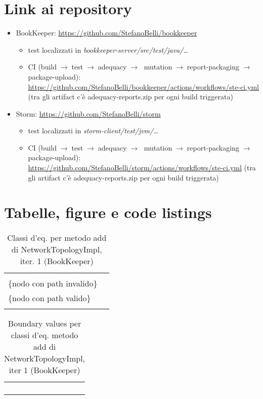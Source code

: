\documentclass[10pt, a4paper]{article}
\newcommand{\Intmaketable}[4]{
	\begin{longtable}{#3}
	#4
	\caption{#2}
	\label{#1}
	\end{longtable}
}
\newcommand{\Intceqtable}[3]{
	\Intmaketable{#1}{#2}{|l|l|}{
	\hline
	\thead{Parametro formale} & \thead{Classi d'equivalenza} \\
	\hline
	\hline
	#3
	\hline}
}
\newcommand{\Intbvtable}[3]{
	\Intmaketable{#1}{#2}{|l|l|l|}{
	\hline
	\thead{Parametro formale} & \thead{Classe d'equivalenza} & \thead{Boundary value}\\
	\hline
	\hline
	#3
	\hline}
}
\newcommand{\Intceqcaption}[4]{Classi d'eq. per metodo #1 di #2, iter. #3 (#4)}
\newcommand{\Intbvcaption}[4]{Boundary values per classi d'eq. metodo #1 di #2, iter #3 (#4)}
\newcommand{\gettablelabel}[5]{table:#1:#2:#3:iter#4:proj#5}
\newcommand{\ceqtable}[5]{
	\Intceqtable{\gettablelabel{ceq}{#1}{#2}{#3}{#4}}
		{\Intceqcaption{#1}{#2}{#3}{#4}}
		{#5}
}
\newcommand{\bvtable}[5]{
	\Intbvtable{\gettablelabel{bv}{#1}{#2}{#3}{#4}}
		{\Intbvcaption{#1}{#2}{#3}{#4}}
		{#5}
}
\newcommand{\tcell}{\makecell[tl]}
\newcommand{\newtrow}{\\ \hline}
\def\bookkeeper{BookKeeper}
\newcommand{\ceq}[1]{\{#1\}}
\begin{document}
	\newpage
	\section{Link ai repository}
	\begin{itemize}
		\item BookKeeper: \url{https://github.com/StefanoBelli/bookkeeper}
		\begin{itemize}
			\item test localizzati in \textit{bookkeeper-server/src/test/java/\dots}
			\item CI (build$\;\rightarrow\;$test$\;\rightarrow\;$adequacy$\;\rightarrow\;$
			mutation$\;\rightarrow\;$report-packaging$\;\rightarrow\;$package-upload): 
			\url{https://github.com/StefanoBelli/bookkeeper/actions/workflows/ste-ci.yml} 
			(tra gli artifact c'è adequacy-reports.zip per ogni build triggerata)
		\end{itemize}
		\item Storm: \url{https://github.com/StefanoBelli/storm}
		\begin{itemize}
			\item test localizzati in \textit{storm-client/test/jvm/\dots}
			\item CI (build$\;\rightarrow\;$test$\;\rightarrow\;$adequacy$\;\rightarrow\;$
			mutation$\;\rightarrow\;$report-packaging$\;\rightarrow\;$package-upload): 
			\url{https://github.com/StefanoBelli/storm/actions/workflows/ste-ci.yml}
			(tra gli artifact c'è adequacy-reports.zip per ogni build triggerata)
		\end{itemize}
	\end{itemize}
	
	\newpage
	\section{Tabelle, figure e code listings}
	
	
	\ceqtable{add}{NetworkTopologyImpl}{1}{\bookkeeper}{
			\tcell{node} & \tcell{\ceq{null} \\ \ceq{nodo con path invalido} \\ \ceq{nodo con path valido} }
		\newtrow
	}
	
	\bvtable{add}{NetworkTopologyImpl}{1}{\bookkeeper}{
			\tcell{node} & \tcell{\ceq{null}} & \tcell{null}
		\newtrow
			\tcell{node} & \tcell{\ceq{nodo con path invalido}} & \tcell{Node("/bookie-1")}
		\newtrow
			\tcell{node} & \tcell{\ceq{nodo con path valido}} & \tcell{Node("/rack-1/bookie-1")}
		\newtrow
	}
	
\end{document}
